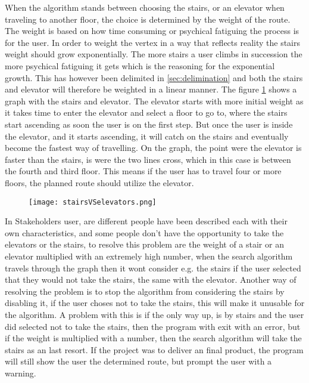 When the algorithm stands between choosing the stairs, or an elevator when traveling to another floor, the choice is determined by the weight of the route. The weight is based on how time consuming or psychical fatiguing the process is for the user. In order to weight the vertex in a way that reflects reality the stairs weight should grow exponentially. The more stairs a user climbs in succession the more psychical fatiguing it gets which is the reasoning for the exponential growth. This has however been delimited in \cref{sec:delimination} and both the stairs and elevator will therefore be weighted in a linear manner. The figure \cref{fig:labeled_stairsVSelevators} shows a graph with the stairs and elevator. The elevator starts with more initial weight as it takes time to enter the elevator and select a floor to go to, where the stairs start ascending as soon the user is on the first step. But once the user is inside the elevator, and it starts ascending, it will catch on the stairs and eventually become the fastest way of travelling. On the graph, the point were the elevator is faster than the stairs, is were the two lines cross, which in this case is between the fourth and third floor. This means if the user has to travel four or more floors, the planned route should utilize the elevator.

\begin{figure}[ht!]
    \centering
    \texttt{[image: stairsVSelevators.png]}
    \label{fig:labeled_stairsVSelevators}
  \end{figure}


In Stakeholders user, are different people have been described each with their own characteristics, and some people don't have the opportunity to take the elevators or the stairs, to resolve this problem are the weight of a stair or an elevator multiplied with an extremely high number, when the search algorithm travels through the graph then it wont consider e.g. the stairs if the user selected that they would not take the stairs, the same with the elevator. Another way of resolving the problem is to stop the algorithm from considering the stairs by disabling it, if the user choses not to take the stairs, this will make it unusable for the algorithm. A problem with this is if the only way up, is by stairs and the user did selected not to take the stairs, then the program with exit with an error, but if the weight is multiplied with a number, then the search algorithm will take the stairs as an last resort. If the project was to deliver an final product, the program will still show the user the determined route, but prompt the user with a warning.




